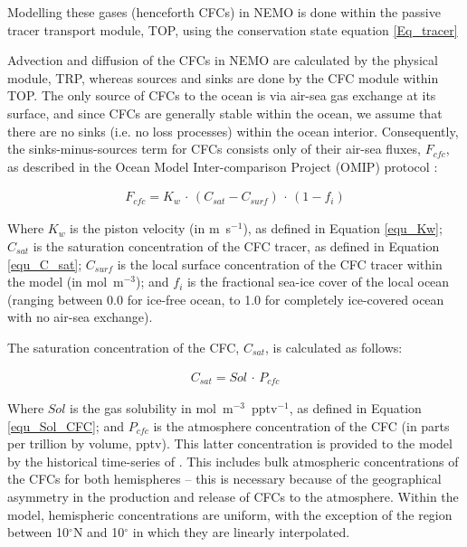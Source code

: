 \documentclass[../main/TOP_manual]{subfiles}
\begin{document}
Modelling these gases (henceforth CFCs) in NEMO is done within the passive tracer transport module, TOP, using the conservation state equation \autoref{Eq_tracer}

Advection and diffusion of the CFCs in NEMO are calculated by the physical module, TRP,
whereas sources and sinks are done by the CFC module within TOP.
The only source of CFCs to the ocean is via air-sea gas exchange at its surface, and since CFCs are generally
stable within the ocean, we assume that there are no sinks (i.e. no loss processes) within the ocean interior.
Consequently, the sinks-minus-sources term for CFCs consists only of their air-sea fluxes, $F_{cfc}$, as
described in the Ocean Model Inter-comparison Project (OMIP) protocol \citep{orr_2017}:


\begin{eqnarray}
F_{cfc} = K_{w} \, \cdot \, (C_{sat} - C_{surf}) \, \cdot  \, (1 - f_{i})
\label{equ_CFC_flux}
\end{eqnarray}

Where $K_{w}$ is the piston velocity (in m~s$^{-1}$), as defined in Equation \autoref{equ_Kw};
$C_{sat}$ is the saturation concentration of the CFC tracer, as defined in Equation \autoref{equ_C_sat};
$C_{surf}$ is the local surface concentration of the CFC tracer within the model (in mol~m$^{-3}$);
and $f_{i}$ is the fractional sea-ice cover of the local ocean (ranging between 0.0 for ice-free ocean,
 to 1.0 for completely ice-covered ocean with no air-sea exchange).

The saturation concentration of the CFC, $C_{sat}$, is calculated as follows:

\begin{eqnarray}
C_{sat} = Sol \, \cdot \, P_{cfc}
\label{equ_C_sat}
\end{eqnarray}

Where $Sol$ is the gas solubility in mol~m$^{-3}$~pptv$^{-1}$, as defined in Equation \autoref{equ_Sol_CFC};
and $P_{cfc}$ is the atmosphere concentration of the CFC (in parts per trillion by volume, pptv).
This latter concentration is provided to the model by the historical time-series of \citet{bullister_2017}.
This includes bulk atmospheric concentrations of the CFCs for both hemispheres -- this is necessary because of
the geographical asymmetry in the production and release of CFCs to the atmosphere.
Within the model, hemispheric concentrations are uniform, with the exception of the region between
10$^{\circ}$N and 10$^{\circ}$ in which they are linearly interpolated.
\end{document}
